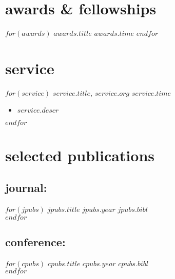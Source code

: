 \documentclass[]{friggeri-cv}
\begin{document}
\section{awards \& fellowships}
\vspace{-0.075in}
\begin{entrylist}
$for(awards)$
  \entryitem
  {$awards.title$}
  {$awards.time$}
$endfor$
\end{entrylist}



\section{service}
\vspace{-0.075in}
\begin{entrylist}
$for(service)$
  \entryitem
  {\textbf{\textit{$service.title$}}, $service.org$}
  {$service.time$}
  \begin{itemize}[noitemsep, leftmargin=0.2in]
    \item $service.descr$
  \end{itemize}
$endfor$
\end{entrylist}



\section{selected publications}
\vspace{-0.075in}

\subsection{journal:}
\begin{entrylist}
$for(jpubs)$
  \entrypub
  {$jpubs.title$}
  {$jpubs.year$}
  {$jpubs.bibl$}\\
$endfor$
\end{entrylist}

\vspace{-0.15in}
\subsection{conference:}
\begin{entrylist}
$for(cpubs)$
  \entrypub
  {$cpubs.title$}
  {$cpubs.year$}
  {$cpubs.bibl$}\\
$endfor$
\end{entrylist}
\end{document}
